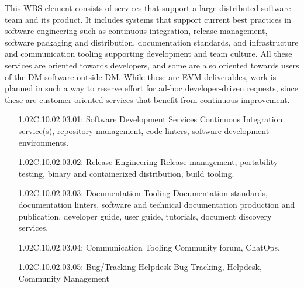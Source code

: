 This WBS element consists of services that support a large distributed
software team and its product. It includes systems that support current
best practices in software engineering such as continuous integration,
release management, software packaging and distribution, documentation
standards, and infrastructure and communication tooling supporting
development and team culture. All these services are oriented towards
developers, and some are also oriented towards users of the DM software
outside DM. While these are EVM deliverables, work is planned in such a
way to reserve effort for ad-hoc developer-driven requests, since these
are customer-oriented services that benefit from continuous improvement.

\begin{itemize}

\item[1.02C.10.02.03.01: Software Development Services]
  Continuous Integration service(s), repository management, code linters,
  software development environments.

\item[1.02C.10.02.03.02: Release Engineering]
  Release management, portability testing, binary and containerized
  distribution, build tooling.

\item[1.02C.10.02.03.03: Documentation Tooling]
  Documentation standards, documentation linters, software and technical
  documentation production and publication, developer guide, user guide,
  tutorials, document discovery services.

\item[1.02C.10.02.03.04: Communication Tooling]
  Community forum, ChatOps.

\item[1.02C.10.02.03.05: Bug/Tracking Helpdesk]
  Bug Tracking, Helpdesk, Community Management

\end{itemize}
